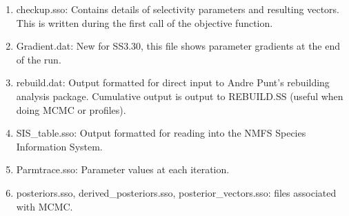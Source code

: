 \begin{enumerate}
		\item checkup.sso:  Contains details of selectivity parameters and resulting vectors.  This is written during the first call of the objective function.
		\item Gradient.dat: New for SS3.30, this file shows parameter gradients at the end of the run.
		\item rebuild.dat:  Output formatted for direct input to Andre Punt's rebuilding analysis package.  Cumulative output is output to REBUILD.SS (useful when doing MCMC or profiles).
		\item SIS\_table.sso:  Output formatted for reading into the NMFS Species Information System.
		\item Parmtrace.sso: Parameter values at each iteration.
		\item posteriors.sso, derived\_posteriors.sso, posterior\_vectors.sso: files associated with MCMC.
	\end{enumerate}

	
